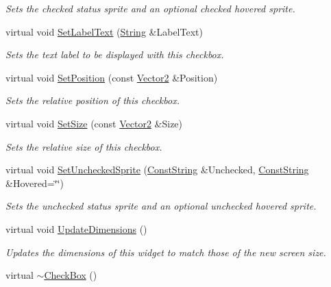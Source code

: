 \begin{DoxyCompactItemize}
\begin{DoxyCompactList}\small\item\em Sets the checked status sprite and an optional checked hovered sprite. \item\end{DoxyCompactList}\item 
virtual void \hyperlink{classMezzanine_1_1UI_1_1CheckBox_a720b1c4a1f4289b81204ed48016caf9e}{SetLabelText} (\hyperlink{namespaceMezzanine_acf9fcc130e6ebf08e3d8491aebcf1c86}{String} \&LabelText)
\begin{DoxyCompactList}\small\item\em Sets the text label to be displayed with this checkbox. \item\end{DoxyCompactList}\item 
virtual void \hyperlink{classMezzanine_1_1UI_1_1CheckBox_ab12deffc753623b224191ee294626a65}{SetPosition} (const \hyperlink{classMezzanine_1_1Vector2}{Vector2} \&Position)
\begin{DoxyCompactList}\small\item\em Sets the relative position of this checkbox. \item\end{DoxyCompactList}\item 
virtual void \hyperlink{classMezzanine_1_1UI_1_1CheckBox_a4fb7dc586245da0cdcfc789f8a1c83a3}{SetSize} (const \hyperlink{classMezzanine_1_1Vector2}{Vector2} \&Size)
\begin{DoxyCompactList}\small\item\em Sets the relative size of this checkbox. \item\end{DoxyCompactList}\item 
virtual void \hyperlink{classMezzanine_1_1UI_1_1CheckBox_a48a0deb7a6bbb25185396fe63c864ac5}{SetUncheckedSprite} (\hyperlink{namespaceMezzanine_a63cd699ac54b73953f35ec9cfc05e506}{ConstString} \&Unchecked, \hyperlink{namespaceMezzanine_a63cd699ac54b73953f35ec9cfc05e506}{ConstString} \&Hovered=\char`\"{}\char`\"{})
\begin{DoxyCompactList}\small\item\em Sets the unchecked status sprite and an optional unchecked hovered sprite. \item\end{DoxyCompactList}\item 
virtual void \hyperlink{classMezzanine_1_1UI_1_1CheckBox_ac7754437c455f40aaf6d4bca4cb0c7a9}{UpdateDimensions} ()
\begin{DoxyCompactList}\small\item\em Updates the dimensions of this widget to match those of the new screen size. \item\end{DoxyCompactList}\item 
\hypertarget{classMezzanine_1_1UI_1_1CheckBox_a3881a44a1149755ea60e6329ad852b3b}{
virtual \hyperlink{classMezzanine_1_1UI_1_1CheckBox_a3881a44a1149755ea60e6329ad852b3b}{$\sim$CheckBox} ()}
\label{classMezzanine_1_1UI_1_1CheckBox_a3881a44a1149755ea60e6329ad852b3b}


\end{DoxyCompactItemize}
